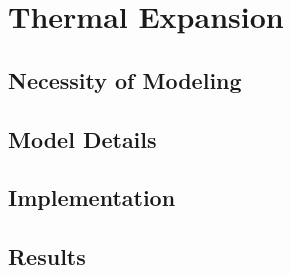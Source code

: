 \chapter{Thermal Expansion}
\label{ch:thermalExpansion}

\section{Necessity of Modeling}

\section{Model Details}

\section{Implementation}

\section{Results}
